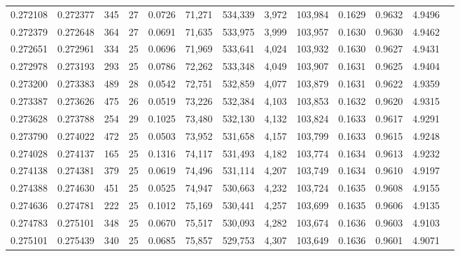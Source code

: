 \begin{tabular}{rrrrrrrrrrrrr}
0.272108 & 0.272377 & 345 &  27 &                                     0.0726 &  71,271 & 534,339 &   3,972 & 103,984 & 0.1629 & 0.9632 & 4.9496 \\
0.272379 & 0.272648 & 364 &  27 &                                     0.0691 &  71,635 & 533,975 &   3,999 & 103,957 & 0.1630 & 0.9630 & 4.9462 \\
0.272651 & 0.272961 & 334 &  25 &                                     0.0696 &  71,969 & 533,641 &   4,024 & 103,932 & 0.1630 & 0.9627 & 4.9431 \\
0.272978 & 0.273193 & 293 &  25 &                                     0.0786 &  72,262 & 533,348 &   4,049 & 103,907 & 0.1631 & 0.9625 & 4.9404 \\
0.273200 & 0.273383 & 489 &  28 &                                     0.0542 &  72,751 & 532,859 &   4,077 & 103,879 & 0.1631 & 0.9622 & 4.9359 \\
0.273387 & 0.273626 & 475 &  26 &                                     0.0519 &  73,226 & 532,384 &   4,103 & 103,853 & 0.1632 & 0.9620 & 4.9315 \\
0.273628 & 0.273788 & 254 &  29 &                                     0.1025 &  73,480 & 532,130 &   4,132 & 103,824 & 0.1633 & 0.9617 & 4.9291 \\
0.273790 & 0.274022 & 472 &  25 &                                     0.0503 &  73,952 & 531,658 &   4,157 & 103,799 & 0.1633 & 0.9615 & 4.9248 \\
0.274028 & 0.274137 & 165 &  25 &                                     0.1316 &  74,117 & 531,493 &   4,182 & 103,774 & 0.1634 & 0.9613 & 4.9232 \\
0.274138 & 0.274381 & 379 &  25 &                                     0.0619 &  74,496 & 531,114 &   4,207 & 103,749 & 0.1634 & 0.9610 & 4.9197 \\
0.274388 & 0.274630 & 451 &  25 &                                     0.0525 &  74,947 & 530,663 &   4,232 & 103,724 & 0.1635 & 0.9608 & 4.9155 \\
0.274636 & 0.274781 & 222 &  25 &                                     0.1012 &  75,169 & 530,441 &   4,257 & 103,699 & 0.1635 & 0.9606 & 4.9135 \\
0.274783 & 0.275101 & 348 &  25 &                                     0.0670 &  75,517 & 530,093 &   4,282 & 103,674 & 0.1636 & 0.9603 & 4.9103 \\
0.275101 & 0.275439 & 340 &  25 &                                     0.0685 &  75,857 & 529,753 &   4,307 & 103,649 & 0.1636 & 0.9601 & 4.9071 \\

\end{tabular}
